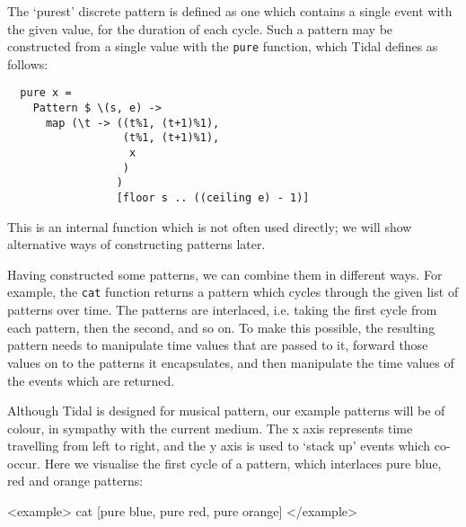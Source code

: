 \documentclass[authoryear,preprint]{sigplanconf}
\begin{document}
The `purest' discrete pattern is defined as one which contains a
single event with the given value, for the duration of each
cycle. Such a pattern may be constructed from a single value with the
\lstinline{pure} function, which Tidal defines as follows:


\begin{center}
\begin{minipage}{0.5\textwidth}
\begin{lstlisting}
  pure x = 
    Pattern $ \(s, e) -> 
      map (\t -> ((t%1, (t+1)%1), 
                  (t%1, (t+1)%1),
                   x
                  )
                 )
                 [floor s .. ((ceiling e) - 1)]
\end{lstlisting}
\end{minipage}
\end{center}

This is an internal function which is not often used directly; we will
show alternative ways of constructing patterns later.


Having constructed some patterns, we can combine them in different
ways. For example, the \lstinline{cat} function returns a pattern
which cycles through the given list of patterns over time. The
patterns are interlaced, i.e. taking the first cycle from each
pattern, then the second, and so on. To make this possible, the
resulting pattern needs to manipulate time values that are passed to
it, forward those values on to the patterns it encapsulates, and then
manipulate the time values of the events which are returned.

Although Tidal is designed for musical pattern, our example patterns
will be of colour, in sympathy with the current medium. The x axis
represents time travelling from left to right, and the y axis is used
to `stack up' events which co-occur. Here we visualise the first cycle
of a pattern, which interlaces pure blue, red and orange patterns:

<example>
cat [pure blue, pure red, pure orange]
</example>

\end{document}
